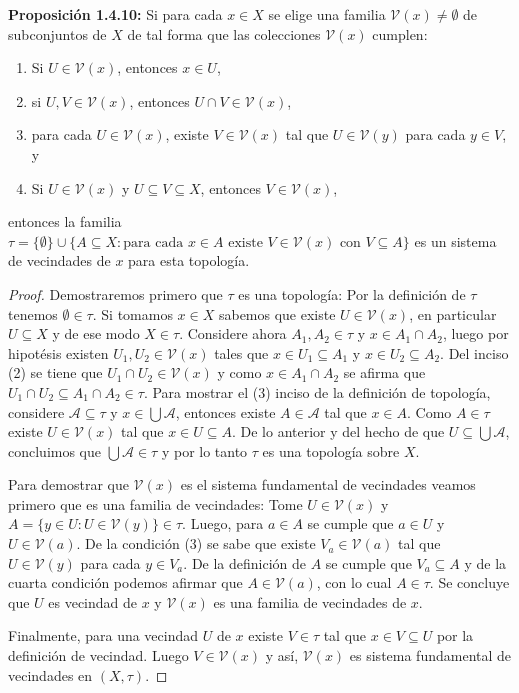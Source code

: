 \textbf{Proposición 1.4.10:} Si para cada $x\in X$ se elige una familia $\mathcal{V}(x)\neq\emptyset$  de subconjuntos de $X$ de tal forma que las colecciones $\mathcal{V}(x)$ cumplen:
\begin{enumerate}
    \item Si $U\in\mathcal{V}(x)$, entonces $x\in U$,
    \item si $U,V\in\mathcal{V}(x)$, entonces $U\cap V\in\mathcal{V}(x)$,
    \item para cada $U\in\mathcal{V}(x)$, existe $V\in\mathcal{V}(x)$ tal que $U\in\mathcal{V}(y)$ para cada $y\in V$, y 
    \item Si $U\in\mathcal{V}(x)$ y $U\subseteq V\subseteq X$, entonces $V\in\mathcal{V}(x)$,
\end{enumerate}
entonces la familia $\tau=\{\emptyset\}\cup\{A\subseteq X:\text{para cada }x\in A\text{ existe }V\in\mathcal{V}(x)\text{ con }V\subseteq A\}$ es un sistema de vecindades de $x$ para esta topología.

\begin{proof}
Demostraremos primero que $\tau$ es una topología: Por la definición de $\tau$ tenemos $\emptyset\in\tau$. Si tomamos $x\in X$ sabemos que existe $U\in\mathcal{V}(x)$, en particular $U\subseteq X$ y de ese modo $X\in\tau$. Considere ahora $A_1,A_2\in\tau$ y $x\in A_1\cap A_2$, luego por hipotésis existen $U_1,U_2\in\mathcal{V}(x)$ tales que $x\in U_1\subseteq A_1$ y $x\in U_2\subseteq A_2$. Del inciso (2) se tiene que $U_1\cap U_2\in\mathcal{V}(x)$ y como $x\in A_1\cap A_2$ se afirma que $U_1\cap U_2\subseteq A_1\cap A_2\in\tau$. Para mostrar el (3) inciso de la definición de topología, considere $\mathcal{A}\subseteq\tau$ y $x\in\bigcup\mathcal{A}$, entonces existe $A\in\mathcal{A}$ tal que $x\in A$. Como $A\in\tau$ existe $U\in\mathcal{V}(x)$ tal que $x\in U\subseteq A$. De lo anterior y del hecho de que $U\subseteq\bigcup\mathcal{A}$, concluimos que $\bigcup\mathcal{A}\in\tau$ y por lo tanto $\tau$ es una topología sobre $X$.

Para demostrar que $\mathcal{V}(x)$ es el sistema fundamental de vecindades veamos primero que es una familia de vecindades: Tome $U\in\mathcal{V}(x)$ y $A=\{y\in U:U\in\mathcal{V}(y)\}\in\tau$. Luego, para $a\in A$ se cumple que $a\in U$ y $U\in\mathcal{V}(a)$. De la condición (3) se sabe que existe $V_a\in\mathcal{V}(a)$ tal que $U\in\mathcal{V}(y)$ para cada $y\in V_a$. De la definición de $A$ se cumple que $V_a\subseteq A$ y de la cuarta condición podemos afirmar que $A\in\mathcal{V}(a)$, con lo cual $A\in\tau$. Se concluye que $U$ es vecindad de $x$ y $\mathcal{V}(x)$ es una familia de vecindades de $x$.

Finalmente, para una vecindad $U$ de $x$ existe $V\in\tau$ tal que $x\in V\subseteq U$ por la definición de vecindad. Luego $V\in\mathcal{V}(x)$ y así, $\mathcal{V}(x)$ es sistema fundamental de vecindades en $(X,\tau)$.
\end{proof}

